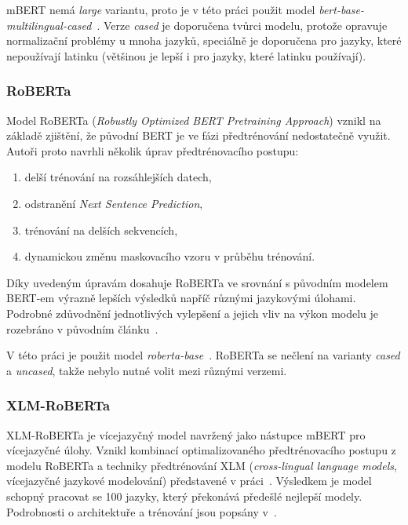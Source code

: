 mBERT nemá \emph{large} variantu, proto je v této práci použit model \emph{bert-base-multilingual-cased}~\cite{mBERTbasecased}. Verze \emph{cased} je doporučena tvůrci modelu, protože opravuje normalizační problémy u mnoha jazyků, speciálně je doporučena pro jazyky, které nepoužívají latinku (většinou je lepší i pro jazyky, které latinku používají).~\cite{GoogleResearchGitHubMulti}

\subsubsection{RoBERTa}
Model RoBERTa (\emph{Robustly Optimized BERT Pretraining Approach}) vznikl na základě zjištění, že původní BERT je ve fázi předtrénování nedostatečně využit. Autoři proto navrhli několik úprav předtrénovacího postupu:

\begin{enumerate}
    \item delší trénování na rozsáhlejších datech,
    \item odstranění \emph{Next Sentence Prediction},
    \item trénování na delších sekvencích,
    \item dynamickou změnu maskovacího vzoru v průběhu trénování.
\end{enumerate}

Díky uvedeným úpravám dosahuje RoBERTa ve srovnání s původním modelem BERT-em výrazně lepších výsledků napříč různými jazykovými úlohami. Podrobné zdůvodnění jednotlivých vylepšení a jejich vliv na výkon modelu je rozebráno v původním článku~\cite{liu2019robertarobustlyoptimizedbert}.

V této práci je použit model \emph{roberta-base}~\cite{RoBERTabase}. RoBERTa se nečlení na varianty \emph{cased} a \emph{uncased}, takže nebylo nutné volit mezi různými verzemi.

\subsubsection{XLM-RoBERTa}
XLM-RoBERTa je vícejazyčný model navržený jako nástupce mBERT pro vícejazyčné úlohy. Vznikl kombinací optimalizovaného předtrénovacího postupu z modelu RoBERTa a techniky předtrénování XLM (\emph{cross-lingual language models}, vícejazyčné jazykové modelování) představené v práci~\cite{lample2019crosslinguallanguagemodelpretraining}. Výsledkem je model schopný pracovat se 100 jazyky, který překonává předešlé nejlepší modely. Podrobnosti o architektuře a trénování jsou popsány v~\cite{conneau2020unsupervisedcrosslingualrepresentationlearning}.


